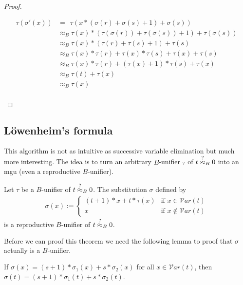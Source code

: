 \begin{proof}
\begin{itemize}
\begin{align*}
		\tau(\sigma'(x))&=\ \ \tau(x*(\sigma(r)+\sigma(s)+1)+\sigma(s))\\
		&\approx_B \tau(x)*(\tau(\sigma(r))+\tau(\sigma(s))+1)+\tau(\sigma(s))\\
		&\approx_B \tau(x)*(\tau(r)+\tau(s)+1)+\tau(s)\\
		&\approx_B \tau(x)*\tau(r)+\tau(x)*\tau(s)+\tau(x)+\tau(s)\\
		&\approx_B \tau(x)*\tau(r)+(\tau(x)+1)*\tau(s)+\tau(x)\\
		&\approx_B \tau(t)+\tau(x)\\
		&\approx_B \tau(x)\\
		\end{align*}
		\end{itemize}
		\end{proof}
		\subsection{Löwenheim's formula}
		This algorithm is not as intuitive as successive variable elimination but much more interesting. The idea is to turn an arbitrary $B$-unifier $\tau$ of $t\stackrel{?}{\approx}_B0$ into an mgu (even a reproductive $B$-unifier).
		\begin{theorem}\label{lowenheim}
		Let $\tau$ be a $B$-unifier of $t\stackrel{?}{\approx}_B0$. The substitution $\sigma$ defined by
		\begin{align*}
		\sigma(x):=\begin{cases}
		(t+1)*x+t*\tau(x) &\text{if }x\in\mathcal{V}ar(t) \\
		x &\text{if }x\notin\mathcal{V}ar(t)
		\end{cases}
		\end{align*}
		is a reproductive $B$-unifier of $t\stackrel{?}{\approx}_B0$.
		\end{theorem}
		Before we can proof this theorem we need the following lemma to proof that $\sigma$ actually is a $B$-unifier. 
		\begin{lemma}\label{lowenLemma}
		If $\sigma(x)=(s+1)*\sigma_1(x)+s*\sigma_2(x)$ for all $x\in\mathcal{V}ar(t)$, then $\sigma(t)=(s+1)*\sigma_1(t)+s*\sigma_2(t)$.
		\end{lemma}

